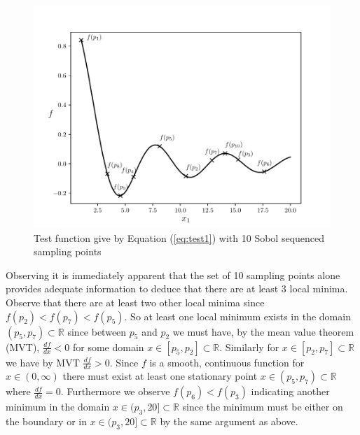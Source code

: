 \begin{figure} [H] 
\centerline{\includegraphics[scale=1.0]{./Fig1.pdf}}
{\caption{Test function give by Equation (\ref{eq:test1}) with 10 Sobol sequenced sampling points} \label{fig:pot1}}
\end{figure}

Observing  it is immediately apparent that the set of 10 sampling points alone provides adequate information to deduce that there are at least 3 local minima. Observe that there are at least two other local minima since $f(p_2) < f(p_7) < f(p_5)$. So at least one local minimum exists in the domain $(p_5, p_7) \subset \mathbb{R}$ since between $p_5$ and $p_2$ we must have, by the mean value theorem (MVT), $\frac{df}{dx} < 0$ for some domain $x \in [p_5, p_2] \subset \mathbb{R}$. Similarly for $x \in [p_2, p_7] \subset \mathbb{R}$ we have by MVT $\frac{df}{dx} > 0$. Since $f$ is a smooth, continuous function for $x \in (0, \infty)$ there must exist at least one stationary point $x  \in (p_5, p_7)  \subset \mathbb{R}$ where $\frac{df}{dx} = 0$. Furthermore we observe $f(p_6) < f(p_3)$ indicating another minimum in the domain $x  \in (p_3, 20] \subset \mathbb{R}$ since the minimum must be either on the boundary or in $x  \in (p_3, 20] \subset \mathbb{R}$ by the same argument as above. %

